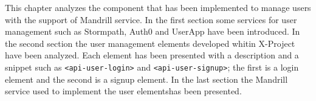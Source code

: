 This chapter analyzes the component that has been implemented to manage users with the support of Mandrill service.
In the first section some services for user management such as Stormpath, Auth0 and UserApp have been introduced.
In the second section the user management elements developed whitin X-Project have been analyzed. Each element has been presented with a description and a snippet such as \texttt{<api-user-login>} and 
\texttt{<api-user-signup>}; the first is a login element and the second is a signup element.
In the last section the Mandrill service used to implement the user elementshas been presented. 
